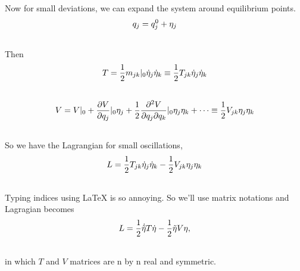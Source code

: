 \documentclass[letterpaper,10pt,english]{sphinxmanual}
\begin{document}
Now for small deviations, we can expand the system around equilibrium points.
\begin{gather}
\begin{split}q_j = q_j^0 + \eta _j\end{split}\notag\\\begin{split}\end{split}\notag
\end{gather}
Then
\begin{gather}
\begin{split}T = \frac{1}{2} m_{jk} \vert _ 0 \dot \eta _ j \dot \eta_k \equiv \frac{1}{2} T_{jk} \dot \eta _ j \dot \eta _k\end{split}\notag\\\begin{split}\end{split}\notag
\end{gather}\begin{gather}
\begin{split}V = V\vert _0 + \frac{\partial V}{\partial q_j}\vert _ 0 \eta_j + \frac{1}{2} \frac{\partial ^ 2 V}{\partial q_j \partial q_k} \vert _ 0 \eta _ j \eta _ k + \cdots \equiv \frac{1}{2} V_{jk}\eta _ j\eta _ k\end{split}\notag\\\begin{split}\end{split}\notag
\end{gather}
So we have the Lagrangian for small oscillations,
\begin{gather}
\begin{split}L = \frac{1}{2} T _ {jk} \dot \eta_j \dot \eta_k - \frac{1}{2} V_{jk}\eta_j \eta_k\end{split}\notag\\\begin{split}\end{split}\notag
\end{gather}
Typing indices using LaTeX is so annoying. So we'll use matrix notations and Lagragian becomes
\begin{gather}
\begin{split}L = \frac{1}{2} \dot {\tilde \eta} T \dot \eta - \frac{1}{2} \tilde \eta V \eta ,\end{split}\notag\\\begin{split}\end{split}\notag
\end{gather}
in which $T$ and $V$ matrices are n by n real and symmetric.
\end{document}
